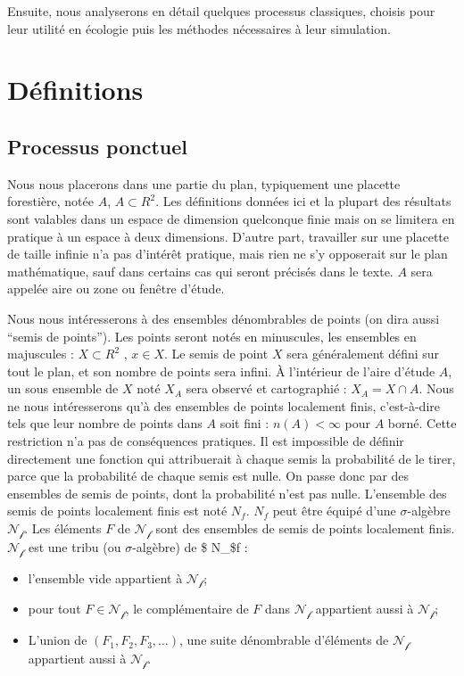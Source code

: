 \documentclass[
  11pt,
  french,
  A4paper,
  extrafontsizes,onecolumn,openright
  ]{memoir}
\theoremstyle{definition}
\theoremstyle{definition}
\theoremstyle{definition}
\theoremstyle{remark}
\begin{document}
Ensuite, nous analyserons en détail quelques processus classiques,
choisis pour leur utilité en écologie puis les méthodes nécessaires à
leur simulation.

\section{Définitions}\label{definitions}

\subsection{Processus ponctuel}\label{processus-ponctuel}

Nous nous placerons dans une partie du plan, typiquement une placette
forestière, notée \(A\), \(A \subset R^2\). Les définitions données ici
et la plupart des résultats sont valables dans un espace de dimension
quelconque finie mais on se limitera en pratique à un espace à deux
dimensions. D'autre part, travailler sur une placette de taille infinie
n'a pas d'intérêt pratique, mais rien ne s'y opposerait sur le plan
mathématique, sauf dans certains cas qui seront précisés dans le texte.
\(A\) sera appelée aire ou zone ou fenêtre d'étude.

Nous nous intéresserons à des ensembles dénombrables de points (on dira
aussi ``semis de points''). Les points seront notés en minuscules, les
ensembles en majuscules : \(X \subset R^2\) , \(x \in X\). Le semis de
point \(X\) sera généralement défini sur tout le plan, et son nombre de
points sera infini. À l'intérieur de l'aire d'étude \(A\), un sous
ensemble de \(X\) noté \(X_A\) sera observé et cartographié :
\(X_A = X \cap A\). Nous ne nous intéresserons qu'à des ensembles de
points localement finis, c'est-à-dire tels que leur nombre de points
dans \(A\) soit fini : \(n(A) < \infty\) pour \(A\) borné. Cette
restriction n'a pas de conséquences pratiques. Il est impossible de
définir directement une fonction qui attribuerait à chaque semis la
probabilité de le tirer, parce que la probabilité de chaque semis est
nulle. On passe donc par des ensembles de semis de points, dont la
probabilité n'est pas nulle. L'ensemble des semis de points localement
finis est noté \(N_f\). \(N_f\) peut être équipé d'une
\(\sigma\)-algèbre \(\mathcal{N_f}\). Les éléments \(F\) de
\(\mathcal{N_f}\) sont des ensembles de semis de points localement
finis. \(\mathcal{N_f}\) est une tribu (ou \(\sigma\)-algèbre) de \$
N\_\$f :

\begin{itemize}
  \item l'ensemble vide appartient à $\mathcal{N_f}$;
  \item pour tout $F \in \mathcal{N_f}$, le complémentaire de $F$ dans $\mathcal{N_f}$ appartient aussi à $\mathcal{N_f}$;
  \item L’union de $(F_1, F_2, F_3,…)$, une suite dénombrable d'éléments de $\mathcal{N_f}$ appartient aussi à $\mathcal{N_f}$.
\end{itemize}
\end{document}
